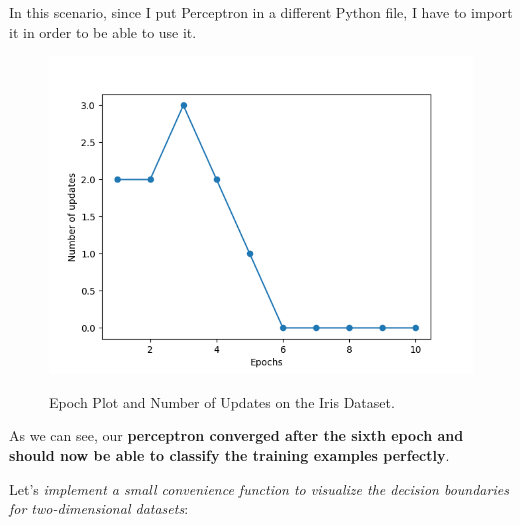 \documentclass[../machine_learning_scikit.tex]{subfiles}
\begin{document}
    \begin{obs}
        In this scenario, since I put Perceptron in a different Python file, I have to import it in order to be able to use it.
    \end{obs}

    \begin{figure}[h]
        \begin{minipage}{\textwidth}
            \centering
            \includegraphics[scale=1]{images/epoch_plot_iris_dataset.png} \\
            \caption{Epoch Plot and Number of Updates on the Iris Dataset.}
            \label{figure:epoch_plot_iris_dataset}
        \end{minipage}
    \end{figure}

    \begin{obs}
        As we can see, our \textbf{perceptron converged after the sixth epoch and should now be able to classify the training examples perfectly}.  
    \end{obs}

    Let's \textit{implement a small convenience function to visualize the decision boundaries for two-dimensional datasets}:
\end{document}
